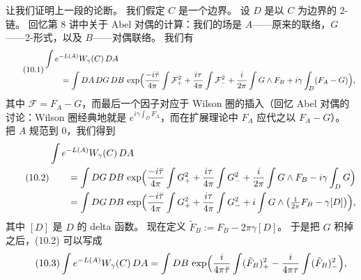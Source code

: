 让我们证明上一段的论断。
我们假定 $C$ 是一个边界。
设 $D$ 是以 $C$ 为边界的 2-链。
回忆第 8 讲中关于 Abel 对偶的计算：我们的场是 $A$——原来的联络，$G$——2-形式，以及 $B$——对偶联络。
我们有
\begin{equation}\tag{10.1}\label{eq:10-1}
\begin{aligned}
&\int e^{-L(A)}W_\gamma(C)\,DA\\
&\qquad=\int DA\,DG\,DB\,\exp\Bigl(\frac{-i\bar\tau}{4\pi}\int\mathcal{F}_+^2+\frac{i\tau}{4\pi}\int\mathcal{F}_-^2+\frac{i}{2\pi}\int G\wedge F_B+i\gamma\int_D(F_A-G)\Bigr),
\end{aligned}
\end{equation}
其中 $\mathcal{F}=F_A-G$，而最后一个因子对应于 Wilson 圈的插入（回忆 Abel 对偶的讨论：Wilson 圈经典地就是 $e^{i\gamma\int_D F_A}$，而在扩展理论中 $F_A$ 应代之以 $F_A-G$）。
把 $A$ 规范到 0，我们得到
\begin{equation}\tag{10.2}\label{eq:10-2}
\begin{aligned}
&\int e^{-L(A)}W_\gamma(C)\,DA\\
&\qquad=\int DG\,DB\,\exp\Bigl(\frac{-i\bar\tau}{4\pi}\int G_+^2+\frac{i\tau}{4\pi}\int G_-^2+\frac{i}{2\pi}\int G\wedge F_B-i\gamma\int_D G\Bigr)\\
&\qquad=\int DG\,DB\,\exp\Bigl(\frac{-i\bar\tau}{4\pi}\int G_+^2+\frac{i\tau}{4\pi}\int G_-^2+i\int G\wedge\bigl(\tfrac{1}{2\pi}F_B-\gamma[D]\bigr)\Bigr),
\end{aligned}
\end{equation}
其中 $[D]$ 是 $D$ 的 delta 函数。
现在定义 $\tilde F_B:=F_B-2\pi\gamma[D]$。
于是把 $G$ 积掉之后，(10.2) 可以写成
\begin{equation}\tag{10.3}\label{eq:10-3}
\int e^{-L(A)}W_\gamma(C)\,DA=\int DB\,\exp\Bigl(\frac{i}{4\pi\bar\tau}\int(\tilde F_B)_+^2-\frac{i}{4\pi\tau}\int(\tilde F_B)_-^2\Bigr),
\end{equation}


